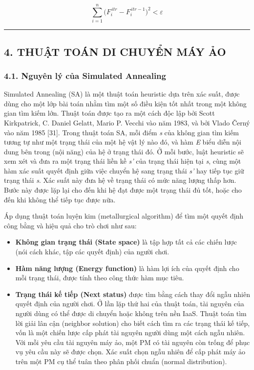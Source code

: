 \documentclass[
  vietnamese,
]{article}
\providecommand{\tightlist}{%
  \setlength{\itemsep}{0pt}\setlength{\parskip}{0pt}}
\begin{document}
\[\sum_{i=1}^{n} \big(F_i^{\,itr} - F_i^{\,itr-1}\big)^2 < \varepsilon \tag{19}\]

\begin{center}\rule{0.5\linewidth}{0.5pt}\end{center}

\subsection{4. THUẬT TOÁN DI CHUYỂN MÁY
ẢO}\label{thuux1eadt-touxe1n-di-chuyux1ec3n-muxe1y-ux1ea3o}

\subsubsection{4.1. Nguyên lý của Simulated
Annealing}\label{nguyuxean-luxfd-cux1ee7a-simulated-annealing}

Simulated Annealing (SA) là một thuật toán heuristic dựa trên xác suất,
được dùng cho một lớp bài toán nhằm tìm một số điều kiện tốt nhất trong
một không gian tìm kiếm lớn. Thuật toán được tạo ra một cách độc lập bởi
Scott Kirkpatrick, C. Daniel Gelatt, Mario P. Vecchi vào năm 1983, và
bởi Vlado Černý vào năm 1985 {[}31{]}. Trong thuật toán SA, mỗi điểm
\emph{s} của không gian tìm kiếm tương tự như một trạng thái của một hệ
vật lý nào đó, và hàm \emph{E} biểu diễn nội dung bên trong (nội năng)
của hệ ở trạng thái đó. Ở mỗi bước, luật heuristic sẽ xem xét và đưa ra
một trạng thái liền kề \emph{s'} của trạng thái hiện tại \emph{s}, cùng
một hàm xác suất quyết định giữa việc chuyển hệ sang trạng thái
\emph{s'} hay tiếp tục giữ trạng thái \emph{s}. Xác suất này đưa hệ về
trạng thái có mức năng lượng thấp hơn. Bước này được lặp lại cho đến khi
hệ đạt được một trạng thái đủ tốt, hoặc cho đến khi không thể tiếp tục
được nữa.

Áp dụng thuật toán luyện kim (metallurgical algorithm) để tìm một quyết
định công bằng và hiệu quả cho trò chơi như sau:

\begin{itemize}
\tightlist
\item
  \textbf{Không gian trạng thái (State space)} là tập hợp tất cả các
  chiến lược (nói cách khác, tập các quyết định) của người chơi.
\item
  \textbf{Hàm năng lượng (Energy function)} là hàm lợi ích của quyết
  định cho mỗi trạng thái, được tính theo công thức hàm mục tiêu.
\item
  \textbf{Trạng thái kế tiếp (Next status)} được tìm bằng cách thay đổi
  ngẫu nhiên quyết định của người chơi. Ở lần lặp thứ hai của thuật
  toán, tài nguyên của người dùng có thể được di chuyển hoặc không trên
  nền IaaS. Thuật toán tìm lời giải lân cận (neighbor solution) cho biết
  cách tìm ra các trạng thái kế tiếp, vốn là một chiến lược cấp phát
  tài nguyên người dùng một cách ngẫu nhiên. Với mỗi yêu cầu tài nguyên
  máy ảo, một PM có tài nguyên còn trống để phục vụ yêu cầu này sẽ được
  chọn. Xác suất chọn ngẫu nhiên để cấp phát máy ảo trên một PM cụ thể
  tuân theo phân phối chuẩn (normal distribution).
\end{itemize}
\end{document}
